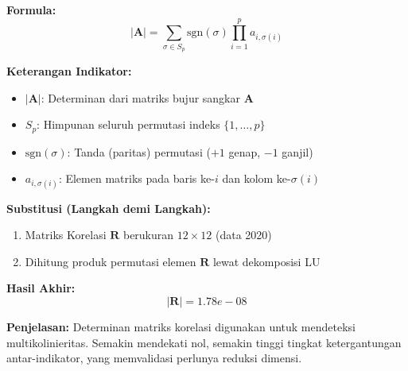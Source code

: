 \documentclass[11pt,a4paper]{article}
\begin{document}
\begin{tcolorbox}[formula_box, title={Determinan Matriks ($|\mathbf{A}|$)}]
\textbf{Formula:}
\[ |\mathbf{A}| = \sum_{\sigma \in S_p} \text{sgn}(\sigma) \prod_{i=1}^{p} a_{i,\sigma(i)} \]

\textbf{Keterangan Indikator:}
\begin{itemize}
  \item $|\mathbf{A}|$: Determinan dari matriks bujur sangkar $\mathbf{A}$
  \item $S_p$: Himpunan seluruh permutasi indeks $\{1, \dots, p\}$
  \item $\text{sgn}(\sigma)$: Tanda (paritas) permutasi ($+1$ genap, $-1$ ganjil)
  \item $a_{i,\sigma(i)}$: Elemen matriks pada baris ke-$i$ dan kolom ke-$\sigma(i)$
\end{itemize}

\textbf{Substitusi (Langkah demi Langkah):}
\begin{enumerate}
  \item Matriks Korelasi $\mathbf{R}$ berukuran $12\times12$ (data 2020)
  \item Dihitung produk permutasi elemen $\mathbf{R}$ lewat dekomposisi LU
\end{enumerate}

\textbf{Hasil Akhir:}
\[ |\mathbf{R}| = 1.78e-08 \]

\textbf{Penjelasan:} Determinan matriks korelasi digunakan untuk mendeteksi multikolinieritas. Semakin mendekati nol, semakin tinggi tingkat ketergantungan antar-indikator, yang memvalidasi perlunya reduksi dimensi.
\end{tcolorbox}
\end{document}
